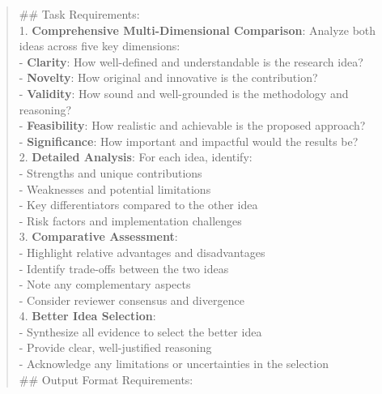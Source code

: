 \begin{quote}
\begin{tcolorbox}[breakable,colback=report!20!white, colframe=report!60!black, title=\textbf{Prompt for Report Agent (Pair Comparison)}]
        \#\# Task Requirements:\\
        
        1. \textbf{Comprehensive Multi-Dimensional Comparison}: Analyze both ideas across five key dimensions:\\
           - \textbf{Clarity}: How well-defined and understandable is the research idea?\\
           - \textbf{Novelty}: How original and innovative is the contribution?\\
           - \textbf{Validity}: How sound and well-grounded is the methodology and reasoning?\\
           - \textbf{Feasibility}: How realistic and achievable is the proposed approach?\\
           - \textbf{Significance}: How important and impactful would the results be?\\
        
        2. \textbf{Detailed Analysis}: For each idea, identify:\\
           - Strengths and unique contributions\\
           - Weaknesses and potential limitations\\
           - Key differentiators compared to the other idea\\
           - Risk factors and implementation challenges\\
        
        3. \textbf{Comparative Assessment}:\\
           - Highlight relative advantages and disadvantages\\
           - Identify trade-offs between the two ideas\\
           - Note any complementary aspects\\
           - Consider reviewer consensus and divergence\\
        
        4. \textbf{Better Idea Selection}:\\
           - Synthesize all evidence to select the better idea\\
           - Provide clear, well-justified reasoning\\
           - Acknowledge any limitations or uncertainties in the selection\\
        
        \#\# Output Format Requirements:\\
        

\end{tcolorbox}
\end{quote}
